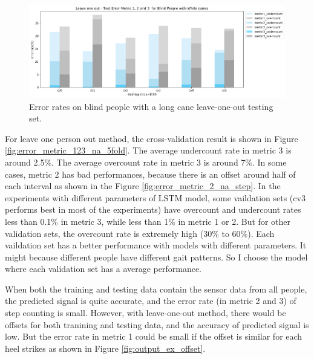 \documentclass[11pt]{article}
\begin{document}
{\begin{figure}[ht]
\centering
\includegraphics[scale=0.5]{error_metric_wc_10fold_test4000}
\caption{Error rates on blind people with a long cane leave-one-out testing set.}
\label{fig:error_metric_wc_10fold_test4000}
\end{figure}

For leave one person out method, the cross-validation result is shown in Figure \ref{fig:error_metric_123_na_5fold}.
The average undercount rate in metric 3 is around 2.5\%. The average overcount rate in metric 3 is around 7\%.
In some cases, metric 2 has bad performances, because there is an offset around half of each interval as shown in the Figure \ref{fig:error_metric_2_na_step}. 
In the experiments with different parameters of LSTM model, some vaildation sets (cv3 performs best in most of the experiments) have overcount and undercount rates less than 0.1\% in metric 3, while less than 1\% in metric 1 or 2. But for other validation sets, the overcount rate is extremely high (30\% to 60\%). Each vaildation set has a better performance with models with different parameters. It might because different people have different gait patterns. So I choose the model where each validation set has a average performance. 

When both the training and testing data contain the sensor data from all people, the predicted signal is quite accurate, and the error rate (in metric 2 and 3) of step counting is small. However, with leave-one-out method, there would be offsets for both tranining and testing data, and the accuracy of predicted signal is low. But the error rate in metric 1 could be small if the offset is similar for each heel strikes as shown in Figure \ref{fig:output_ex_offset}. 

}
\end{document}
